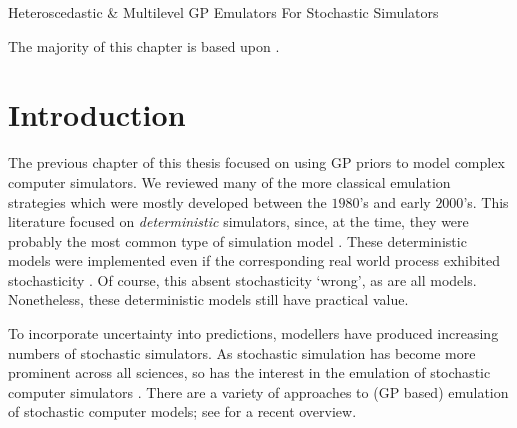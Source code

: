 \begin{chapter}{Heteroscedastic \& Multilevel GP Emulators For Stochastic Simulators\label{Ch:Hetsml}}


The majority of this chapter is based upon \citet{Kennedy2020}.
\section{Introduction}
The previous chapter of this thesis focused on using GP priors to model complex computer simulators. We reviewed many of the more classical emulation strategies which were mostly developed between the $1980$'s and early $2000$'s. This literature focused on \textit{deterministic} simulators, since, at the time, they were probably the most common type of simulation model \citep{Sacks89,Craig1997, Ohagan01, Santner2003}. These deterministic models were implemented even if the corresponding real world process exhibited stochasticity \citep{Ohagan01}. Of course, this absent stochasticity `wrong', as are all models. Nonetheless, these deterministic models still have practical value\georgebox.

To incorporate uncertainty into predictions, modellers have produced increasing numbers of stochastic simulators. As stochastic simulation has become more prominent across all sciences, so has the interest in the emulation of stochastic computer simulators \citep{Astfalck19, Rocchetta2018, Boys2018}. There are a variety of approaches to (GP based) emulation of stochastic computer models; see \citet{Baker2022} for a recent overview.


\end{chapter}
